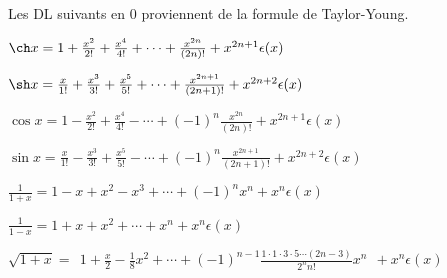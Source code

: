 \documentclass[class=report,crop=false]{standalone}
\begin{document}
Les DL suivants en $0$ proviennent de la formule de Taylor-Young.
\begin{center}

\smallskip


$\ch x=1+\frac{x^2}{2!}+\frac{x^4}{4!}+\cdots+\frac{x^{2n}}{(2n)!}
+x^{2n+1}\epsilon(x)$

\smallskip

$\sh x=\frac{x}{1!}+\frac{x^3}{3!}+\frac{x^5}{5!}+\cdots
+\frac{x^{2n+1}}{(2n+1)!}
+x^{2n+2}\epsilon(x)$

\smallskip

$\cos x=1-\frac{x^2}{2!}+\frac{x^4}{4!}-\cdots+(-1)^n\frac{x^{2n}}{(2n)!}
+x^{2n+1}\epsilon(x)$

\smallskip

$\sin x=\frac{x}{1!}-\frac{x^3}{3!}+\frac{x^5}{5!}-\cdots
+(-1)^n\frac{x^{2n+1}}{(2n+1)!}
+x^{2n+2}\epsilon(x)$

\smallskip


\smallskip


\smallskip

${\displaystyle \frac{1}{1+x}}=1-x+x^2-x^3+\cdots+(-1)^nx^n+x^n\epsilon(x)$

\smallskip

${\displaystyle \frac{1}{1-x}} = 1+x+x^2+\cdots+x^n+x^n\epsilon(x)$

\smallskip

$\sqrt{1+x}  =\ \ 1 + \frac{x}{2} - \frac{1}{8}x^2+ \cdots +
(-1)^{n-1} \frac{1\cdot1\cdot3\cdot5\cdots(2n-3)}{2^n n!}x^n\ \  + x^n\epsilon(x)$
\end{center}
\end{document}
